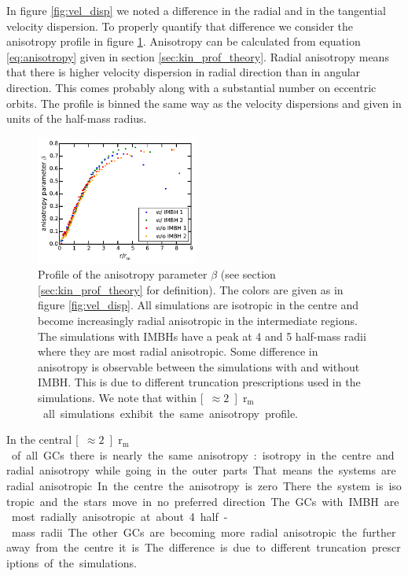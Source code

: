 \par In figure \ref{fig:vel_disp} we noted a difference in the radial and in the tangential velocity dispersion. To properly quantify that difference we consider the anisotropy profile in figure \ref{fig:anisotropy_param}. Anisotropy can be calculated from equation \eqref{eq:anisotropy} given in section \ref{sec:kin_prof_theory}.  Radial anisotropy means that there is higher velocity dispersion in radial direction than in angular direction. This comes probably along with a substantial number on eccentric orbits. The profile is binned the same way as the velocity dispersions and given in units of the half-mass radius.
\begin{figure}[htbp]
	\centering
	\includegraphics[width=0.475\textwidth]{Plots/anisotropy_parameter_beta.pdf}
	\caption{Profile of the anisotropy parameter \(\beta\) (see section \ref{sec:kin_prof_theory} for definition). The colors are given as in figure \ref{fig:vel_disp}. All simulations are isotropic in the centre and become increasingly radial anisotropic in the intermediate regions. The simulations with \acp{IMBH} have a peak at 4 and 5 half-mass radii where they are most radial anisotropic. Some difference in anisotropy is observable between the simulations with and without \ac{IMBH}. This is due to different truncation prescriptions used in the simulations. We note that within \unit[\(\approx 2\)]{\(\mathrm{r_m}\)} all simulations exhibit the same anisotropy profile.}
	\label{fig:anisotropy_param}
\end{figure}
In the central \unit[\(\approx 2\)]{\(\mathrm{r_m}\)} of all \acp{GC} there is nearly the same anisotropy: isotropy in the centre and radial anisotropy while going in the outer parts. That means the systems are radial anisotropic. In the centre the anisotropy is zero. There the system is isotropic and the stars move in no preferred direction. The \acp{GC} with \ac{IMBH} are most radially anisotropic at about 4 half-mass radii. The other \acp{GC} are becoming more radial anisotropic the further away from the centre it is. The difference is due to different truncation prescriptions of the simulations.

